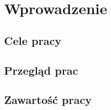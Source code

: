 \chapter{Wprowadzenie}
\label{cha:wprowadzenie}


\section{Cele pracy}
\label{sec:celePracy}


\section{Przegląd prac}
\label{sec:przegladPrac}


\section{Zawartość pracy}
\label{sec:zawartoscPracy}



















